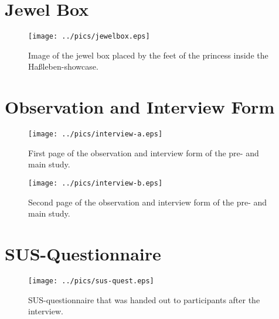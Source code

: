 \section{Jewel Box}
\label{appendix_box}
\phantom{a}

\begin{figure}[H]%
\texttt{[image: ../pics/jewelbox.eps]}%
\caption*{Image of the jewel box placed by the feet of the princess inside the Ha\ss leben-showcase.}%
\end{figure}

\newpage
\section{Observation and Interview Form}
\label{appendix_form}

\begin{figure}[H]%
\texttt{[image: ../pics/interview-a.eps]}%
\caption*{First page of the observation and interview form of the pre- and main study.}%
\end{figure}

\begin{figure}[H]%
\texttt{[image: ../pics/interview-b.eps]}%
\caption*{Second page of the observation and interview form of the pre- and main study.}%
\end{figure}

\newpage
\section{SUS-Questionnaire}
\label{appendix_sus}

\begin{figure}[H]%
\centering
	\texttt{[image: ../pics/sus-quest.eps]}%
	\caption*{SUS-questionnaire that was handed out to participants after the interview.}%
\end{figure}
